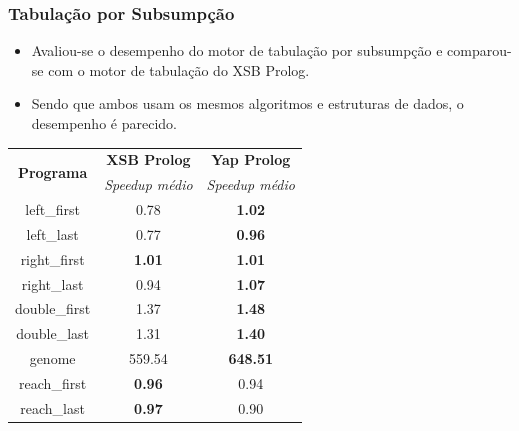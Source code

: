 \documentclass{beamer}
\begin{document}
\begin{frame}
   \frametitle{Tabulação por Subsumpção}
   \begin{itemize}
      \item Avaliou-se o desempenho do motor de tabulação por subsumpção e comparou-se com
      o motor de tabulação do XSB Prolog.
      \item Sendo que ambos usam os mesmos algoritmos e estruturas de dados, o desempenho é parecido.
   \end{itemize}
   {\footnotesize
   \begin{center}
     \begin{tabular}{ccc}
      \hline
       \hline
       \multirow{2}{*}{\textbf{Programa}} & \textbf{XSB Prolog} & \textbf{Yap Prolog} \\
       & \textit{\small{Speedup médio}} & \textit{\small{Speedup médio}} \\
      \hline
      \hline
   left\_first & 0.78 & \textbf{1.02} \\
   left\_last & 0.77  & \textbf{0.96} \\
   right\_first & \textbf{1.01} & \textbf{1.01} \\
   right\_last & 0.94 & \textbf{1.07} \\
   double\_first & 1.37 & \textbf{1.48} \\
   double\_last & 1.31 & \textbf{1.40} \\
   genome & 559.54 & \textbf{648.51} \\
   reach\_first  & \textbf{0.96} & 0.94 \\
   reach\_last  & \textbf{0.97} & 0.90 \\
   \hline
   \hline
   \end{tabular}
   \end{center}}
\end{frame}
\end{document}
